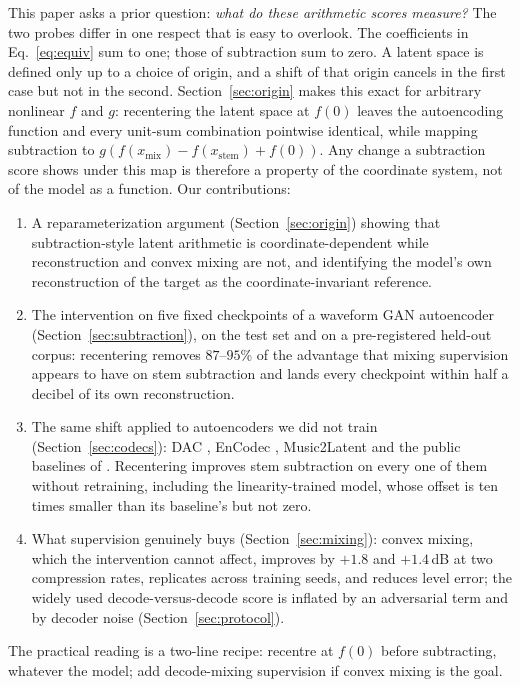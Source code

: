 \documentclass[conference]{IEEEtran}
\newcommand{\secref}[1]{Section~\ref{#1}}
\begin{document}
This paper asks a prior question: \emph{what do these arithmetic scores
measure?} The two probes differ in one respect that is easy to overlook. The
coefficients in Eq.~\ref{eq:equiv} sum to one; those of subtraction sum to
zero. A latent space is defined only up to a choice of origin, and a shift of
that origin cancels in the first case but not in the second.
\secref{sec:origin} makes this exact for arbitrary nonlinear $f$ and $g$:
recentering the latent space at $f(0)$ leaves the autoencoding function and
every unit-sum combination pointwise identical, while mapping subtraction to
$g(f(x_\mathrm{mix}){-}f(x_\mathrm{stem}){+}f(0))$. Any change a subtraction
score shows under this map is therefore a property of the coordinate system,
not of the model as a function. Our contributions:
\begin{enumerate}
  \item A reparameterization argument (\secref{sec:origin}) showing that
  subtraction-style latent arithmetic is coordinate-dependent while
  reconstruction and convex mixing are not, and identifying the model's own
  reconstruction of the target as the coordinate-invariant reference.
  \item The intervention on five fixed checkpoints of a waveform GAN
  autoencoder (\secref{sec:subtraction}), on the test set and on a
  pre-registered held-out corpus: recentering removes $87$--$95$\% of the
  advantage that mixing supervision appears to have on stem subtraction and
  lands every checkpoint within half a decibel of its own reconstruction.
  \item The same shift applied to autoencoders we did not train
  (\secref{sec:codecs}): DAC \cite{kumar2024dac}, EnCodec
  \cite{defossez2023encodec}, Music2Latent \cite{pasini2024music2latent} and
  the public baselines of \cite{torres2026linearity}. Recentering improves
  stem subtraction on every one of them without retraining, including the
  linearity-trained model, whose offset is ten times smaller than its
  baseline's but not zero.
  \item What supervision genuinely buys (\secref{sec:mixing}): convex mixing,
  which the intervention cannot affect, improves by $+1.8$ and $+1.4$\,dB at
  two compression rates, replicates across training seeds, and reduces level
  error; the widely used decode-versus-decode score is inflated by an
  adversarial term and by decoder noise (\secref{sec:protocol}).
\end{enumerate}
The practical reading is a two-line recipe: recentre at $f(0)$ before
subtracting, whatever the model; add decode-mixing supervision if convex
mixing is the goal.
\end{document}
